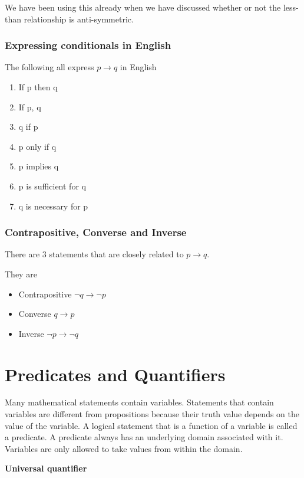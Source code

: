 \documentclass[12pt]{article}
\begin{document}
We have been using this already when we have discussed whether or not the less-than relationship is anti-symmetric. 

\subsubsection*{Expressing conditionals in English}

The following all express $p \rightarrow q$ in English

\begin{enumerate}
\item If p then q
\item If p, q
\item q if p
\item p only if q
\item p implies q
\item p is sufficient for q
\item q is necessary for p
\end{enumerate}

\subsubsection*{Contrapositive, Converse and Inverse}

There are 3 statements that are closely related to $p \rightarrow q$.

They are 

\begin{itemize}
\item Contrapositive $\neg q \rightarrow \neg p$
\item Converse $q \rightarrow p$
\item Inverse $\neg p \rightarrow \neg q$
\end{itemize}

\section*{Predicates and Quantifiers}
Many mathematical statements contain variables. Statements that contain variables are different from propositions because their truth value depends on the value of the variable. A logical statement that is a function of a variable is called a predicate. A predicate always has an underlying domain associated with it. Variables are only allowed to take values from within the domain.

\medskip

\textbf{Universal quantifier}
\end{document}
